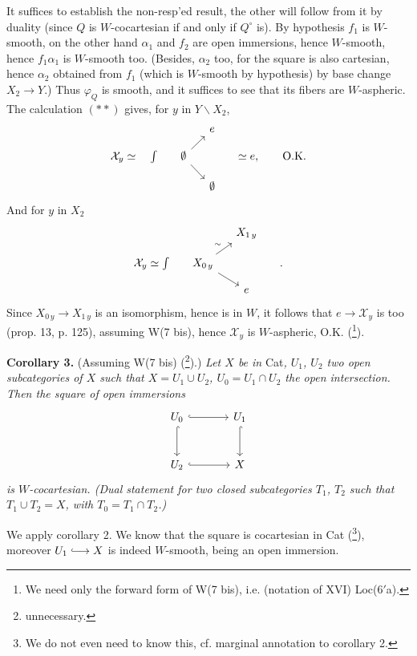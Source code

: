 It suffices to establish the non-resp'ed result, the other will follow from it by duality (since $Q$ is $W$-cocartesian if and only if $Q^\circ$ is). By hypothesis $f_1$ is $W$-smooth, on the other hand $\alpha_1$ and $f_2$ are open immersions, hence $W$-smooth, hence $f_1\alpha_1$ is $W$-smooth too. (Besides, $\alpha_2$ too, for the square is also cartesian, hence $\alpha_2$ obtained from $f_1$ (which is $W$-smooth by hypothesis) by base change $X_2 \longrightarrow Y$.) Thus $\varphi_Q$ is smooth, and it suffices to see that its fibers are $W$-aspheric. The calculation $(**)$ gives, for $y$ in $Y\backslash X_2$,
\[
\begin{tikzcd}[row sep=small, column sep=small]
 & & e & \\
\mathcal{X}_y \simeq \quad \int &[-1.2em] \emptyset \arrow[ur] \arrow[dr] & &[1em] \simeq e, \qquad \text{O.K.} \\
 & & \emptyset &
\end{tikzcd}
\]
And for $y$ in $X_2$
\[
\begin{tikzcd}[row sep=small, column sep=small]
 & & X_{1\,y} & \\
\mathcal{X}_y \simeq \int &[-1.2em] X_{0\,y} \arrow[ur,"\sim"] \arrow[dr] & &[2em] . \\
 & & e &
\end{tikzcd}
\]
Since $X_{0\,y} \longrightarrow X_{1\,y}$ is an isomorphism, hence is in $W$, it follows that $e \longrightarrow \mathcal{X}_y$ is too (prop. 13, p. 125), assuming W(7 bis), hence $\mathcal{X}_y$ is $W$-aspheric, O.K. (\footnote{We need only the forward form of W(7 bis), i.e. (notation of XVI) Loc(6$'$a).}).

\textbf{Corollary 3.} (Assuming W(7 bis) (\footnote{unnecessary.}).) \textit{Let $X$ be in} Cat\textit{, $U_1$, $U_2$ two open subcategories of $X$ such that $X = U_1 \cup U_2$, $U_0 = U_1 \cap U_2$ the open intersection. Then the square of open immersions}
\[
\begin{tikzcd}[row sep=large, column sep=large]
U_0 \arrow[r,hook] \arrow[d,hook] & U_1 \arrow[d,hook] \\
U_2 \arrow[r,hook] & X
\end{tikzcd}
\]
\textit{is $W$-cocartesian. (Dual statement for two closed subcategories $T_1$, $T_2$ such that $T_1 \cup T_2 = X$, with $T_0 = T_1 \cap T_2$.)}

We apply corollary 2. We know that the square is cocartesian in Cat (\footnote{We do not even need to know this, cf. marginal annotation to corollary 2.}), moreover $U_1 \lhook\joinrel\longrightarrow X$ is indeed $W$-smooth, being an open immersion.